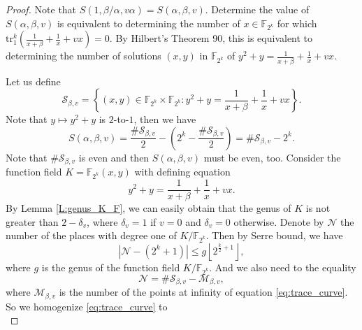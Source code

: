 \documentclass[8pt,oneside]{article}
\newcommand{\0}{\textbf{0}}
\newcommand{\1}{\textbf{1}}
\newcommand{\tr}{\mathrm{tr}_1^k}
\newcommand{\F}{\mathbb{F}}
\newtheorem{proof}{Proof}
\begin{document}
    \begin{proof}
        Note that $ S(1,\beta/\alpha,v\alpha)=S(\alpha,\beta,v) $.
        Determine the value of $ S(\alpha,\beta,v) $ is equivalent to determining the number of $ x\in\F_{2^k} $ 
        for which $ \tr\left( \frac{1}{x+\beta}+\frac{1}{x}+vx \right)=0 $. 
        By Hilbert's Theorem 90, this is equivalent to determining the number of solutions $ (x,y) $ 
        in $ \F_{2^k} $ of $ y^2+y=\frac{1}{x+\beta}+\frac{1}{x}+vx $.
        
        Let us define 
        \[\mathcal{S}_{\beta,v}=\left\{(x,y)\in\F_{2^k}\times\F_{2^k}:y^2+y=\frac{1}{x+\beta}+\frac{1}{x}+vx\right\}.\]
        Note that $ y\mapsto y^2+y $ is $ 2 $-to-$ 1 $, then we have 
        \begin{equation}\label{eq:tracesum_S}
            S(\alpha,\beta,v)=\frac{\#\mathcal{S}_{\beta,v}}{2}-\left(2^k-\frac{\#\mathcal{S}_{\beta,v}}{2}\right)=\#\mathcal{S}_{\beta,v}-2^k.
        \end{equation}
        Note that $ \#\mathcal{S}_{\beta,v} $ is even and then $ S(\alpha,\beta,v) $ must be even, too. 
        Consider the function field $ K=\F_{2^k}(x,y) $ with defining equation 
        \begin{equation}\label{eq:trace_curve}
            y^2+y=\frac{1}{x+\beta}+\frac{1}{x}+vx.
        \end{equation}
        By Lemma \ref{L:genus_K_F}, we can easily obtain that the genus of $ K $ is not greater than $ 2-\delta_v $, 
        where $ \delta_v=1 $ if $ v=0 $ and $ \delta_v=0 $ otherwise. 
        Denote by $ \mathcal{N} $ the number of the places with degree one of $ K/\F_{2^k} $. 
        Then by Serre bound\cite{Serre1982serrebound}, we have 
        \begin{equation}\label{eq:N_genus_inequality}
            \left\lvert \mathcal{N}-(2^k+1)\right\rvert\le g\left\lfloor 2^{\frac{k}{2}+1}\right\rfloor,
        \end{equation}
        where $ g $ is the genus of the function field $ K/\F_{2^k} $. 
        And we also need to the equality 
        \begin{equation}\label{eq:N_S_M_equality}
            \mathcal{N}=\#\mathcal{S}_{\beta,v}-\mathcal{M}_{\beta,v},
        \end{equation}
        where $ \mathcal{M}_{\beta,v} $ is the number of the points at infinity of equation \eqref{eq:trace_curve}. 
        So we homogenize \eqref{eq:trace_curve} to 
        \begin{equation}\label{eq:homogenize}

\end{equation}
\end{proof}
\end{document}
